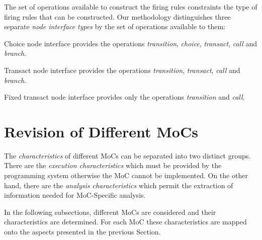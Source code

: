 The set of operations available to construct the firing rules constraints
the type of firing rules that can be constructed.
Our methodology distinguishes three separate \emph{node interface types}
by the set of operations available to them:

\begin{definition}\label{choice-node-interface-type}
Choice node interface provides the operations
\emph{transition}, \emph{choice}, \emph{transact}, \emph{call} and \emph{branch}.
\end{definition}

\begin{definition}\label{transact-node-interface-type}
Transact node interface provides the operations
\emph{transition}, \emph{transact}, \emph{call} and \emph{branch}.
\end{definition}

\begin{definition}\label{fixed-transact-node-interface-type}
Fixed transact node interface provides only the operations
\emph{transition} and \emph{call}.
\end{definition}


\section{Revision of Different MoCs}\label{revision-of-mocs}

The \emph{characteristics} of different MoCs can be separated into two distinct groups.
There are the \emph{execution characteristics} which must be provided by
the programming system otherwise the MoC cannot be implemented.
On the other hand, there are the \emph{analysis characteristics} which
permit the extraction of information needed for MoC-Specific analysis.

In the following subsections, different MoCs are considered and their
characteristics are determined. For each MoC these characteristics are
mapped onto the aspects presented in the previous Section.

